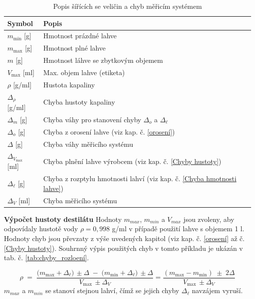 \begin{table}[H]
    \centering
    \begin{tabular}{|l|l|}
        \hline
        \textbf{Symbol} & \textbf{Popis} \\ \hline \hline
        $m_{\text{min}}$ [g] & Hmotnost prázdné lahve \\ \hline
        $m_{\text{max}}$ [g]& Hmotnost plné lahve \\ \hline
        $m$ [g]& Hmotnost láhve se zbytkovým objemem \\ \hline
        $V_{\text{max}}$ [ml] & Max. objem lahve (etiketa) \\ \hline
        $\rho$ [g/ml]& Hustota kapaliny \\ \hline
        $\Delta_{\rho}$ [g/ml] & Chyba hustoty kapaliny \\ \hline
        $\Delta_m$ [g]& Chyba váhy pro stanovení chyby $\Delta_o$ a $\Delta_\ell$ \\ \hline
        $\Delta_o$ [g]& Chyba z orosení lahve (viz kap. č. \ref{orosení}) \\ \hline
        $\Delta$ [g]& Chyba váhy měřicího systému \\ \hline
        $\Delta_{V_{\text{max}}}$ [ml]& Chyba plnění lahve výrobcem (viz kap. č. \ref{Chyby hustoty}) \\ \hline
        $\Delta_\ell$ [g]& Chyba z rozptylu hmotnosti lahví (viz kap. č. \ref{Chyba hmotnosti lahve}) \\ \hline
        $\Delta_V$ [ml]& Chyba měřicího systému \\ \hline
    \end{tabular}
    \caption{Popis šířících se veličin a chyb měřicím systémem}
    \label{tab:popis-symbolu}
\end{table}

\noindent\textbf{Výpočet hustoty destilátu} 
\smallskip
\newline
Hodnoty $m_{max}$, $m_{min}$ a $V_{max}$ jsou zvoleny, aby odpovídaly hustotě vody $\rho = 0,998$ g/ml v případě použití lahve s objemem 1 l. Hodnoty chyb jsou převzaty z výše uvedených kapitol (viz kap. č. \ref{orosení} až č. \ref{Chyby hustoty}). Souhrnný výpis použitých chyb v tomto příkladu je ukázán v tab. č. \ref{tab:chyby_rozloení}.

\begin{equation}
    \rho \;=\;
\frac{\bigl(m_{\max}+\Delta_{\ell}\bigr)\,\pm\Delta
      \;-\;\bigl(m_{\min}+\Delta_{\ell}\bigr)\,\pm\Delta}
     {V_{\max}\,\pm\Delta_V} = \frac{(m_{\max}-m_{\min})\;\pm\;2\Delta}
     {V_{\max}\,\pm\Delta_V}   
     \label{hustotaa}
\end{equation}
\bigskip
$m_{max}$ a $m_{min}$ se stanoví stejnou lahví, čímž se jejich chyby $\Delta_\ell$ navzájem vyruší.

